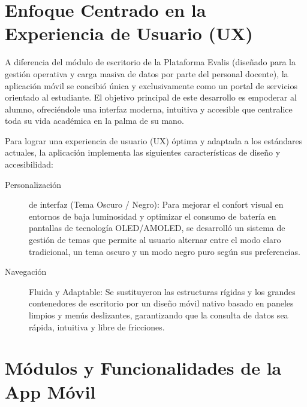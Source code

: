 \documentclass[spanish]{report}
\begin{document}
\section{Enfoque Centrado en la Experiencia de Usuario (UX)}

A diferencia del módulo de escritorio de la Plataforma Evalis (diseñado
para la gestión operativa y carga masiva de datos por parte del personal
docente), la aplicación móvil se concibió única y exclusivamente como
un portal de servicios orientado al estudiante. El objetivo principal
de este desarrollo es empoderar al alumno, ofreciéndole una interfaz
moderna, intuitiva y accesible que centralice toda su vida académica
en la palma de su mano.

Para lograr una experiencia de usuario (UX) óptima y adaptada a los
estándares actuales, la aplicación implementa las siguientes características
de diseño y accesibilidad:
\begin{description}
\item [{Personalización}] de interfaz (Tema Oscuro / Negro): Para mejorar
el confort visual en entornos de baja luminosidad y optimizar el consumo
de batería en pantallas de tecnología OLED/AMOLED, se desarrolló un
sistema de gestión de temas que permite al usuario alternar entre
el modo claro tradicional, un tema oscuro y un modo negro puro según
sus preferencias.
\item [{Navegación}] Fluida y Adaptable: Se sustituyeron las estructuras
rígidas y los grandes contenedores de escritorio por un diseño móvil
nativo basado en paneles limpios y menús deslizantes, garantizando
que la consulta de datos sea rápida, intuitiva y libre de fricciones.
\end{description}

\section{Módulos y Funcionalidades de la App Móvil}
\end{document}
